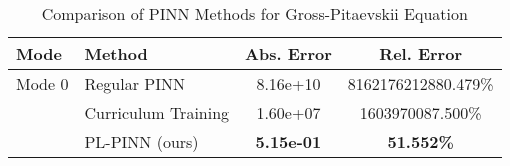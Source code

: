 \begin{table}[htbp]
\centering
\caption{Comparison of PINN Methods for Gross-Pitaevskii Equation}
\label{tab:pinn_comparison}
\begin{tabular}{llcc}
\toprule
Mode & Method & Abs. Error & Rel. Error \\
\midrule
Mode 0 & Regular PINN & 8.16e+10 & 8162176212880.479\% \\
 & Curriculum Training & 1.60e+07 & 1603970087.500\% \\
 & PL-PINN (ours) & \textbf{5.15e-01} & \textbf{51.552\%} \\
\bottomrule
\end{tabular}
\end{table}